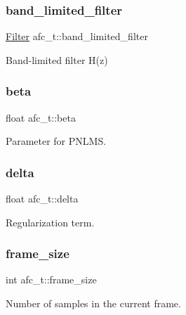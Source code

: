 \subsubsection{\texorpdfstring{band\+\_\+limited\+\_\+filter}{band\_limited\_filter}}
{\footnotesize\ttfamily \mbox{\hyperlink{filter_8h_a69e34b8aa259d2ca0b81b5c95f395bdf}{Filter}} afc\+\_\+t\+::band\+\_\+limited\+\_\+filter}



Band-\/limited filter H(z) 

\mbox{\label{structafc__t_a829042affbb45e80df502fc95134b673}} 
\subsubsection{\texorpdfstring{beta}{beta}}
{\footnotesize\ttfamily float afc\+\_\+t\+::beta}



Parameter for P\+N\+L\+MS. 

\mbox{\label{structafc__t_a472432ba992e61143df0a1ab83981c10}} 
\subsubsection{\texorpdfstring{delta}{delta}}
{\footnotesize\ttfamily float afc\+\_\+t\+::delta}



Regularization term. 

\mbox{\label{structafc__t_acb59e5af368aca0b2840fa76e5e5a000}} 
\subsubsection{\texorpdfstring{frame\+\_\+size}{frame\_size}}
{\footnotesize\ttfamily int afc\+\_\+t\+::frame\+\_\+size}



Number of samples in the current frame. 

\mbox{\label{structafc__t_a7b343e47789c5a03ba4a37671c281861}} 
